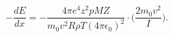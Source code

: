 \begin{equation}
  -\frac{dE}{dx}=-\frac{4\pi e^4 z^2 p MZ}{m_0 v^2 R\rho T (4\pi\epsilon_0)^2}\cdot\Big(\frac{2m_0v^2}{I}\Big).
  \label{eqn:BetheBlochDruck}
\end{equation}

